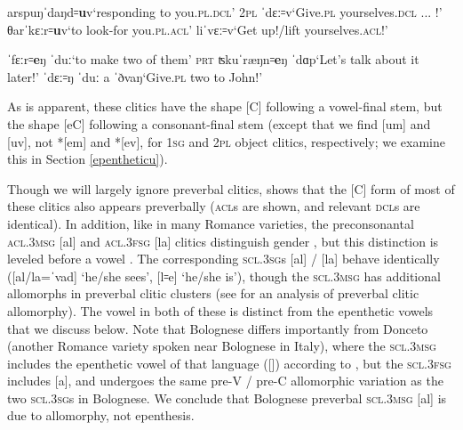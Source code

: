 \documentclass[output=paper,colorlinks,citecolor=brown]{langscibook}
\begin{document}
\begin{exe}
\begin{xlist}
                    \ex \begin{xlisti}
                        \ex arspuŋˈdaŋd꞊\textbf{u}v\tab `responding to you.\textsc{pl}.\textsc{dcl}'\tab \hspace{5mm} 2\textsc{pl}
                        \ex ˈdɛː꞊v\tab `Give.\textsc{pl} yourselves.\textsc{dcl} ... !'
                        \ex θarˈkɛːr꞊\textbf{u}v\tab `to look-for you.\textsc{pl}.\textsc{acl}'
                        \ex liˈvɛː꞊v\tab `Get up!/lift yourselves.\textsc{acl}!'
                    \end{xlisti}
                    \ex \begin{xlisti}
                        \ex ˈfɛːr꞊\textbf{e}ŋ ˈduː\tab `to make two of them'\tab \hspace{5mm} \textsc{prt}
                        \ex ʦkuˈræŋn꞊\textbf{e}ŋ ˈdɑp\tab `Let's talk about it later!'
                        \ex ˈdɛː꞊ŋ ˈduː a ˈðvaŋ\tab `Give.\textsc{pl} two to John!'
                    \end{xlisti}
                    
			\end{xlist}
\end{exe}


As is apparent, these clitics have the shape [C] following a vowel-final stem, but the shape [eC] following a consonant-final stem (except that we find [um] and [uv], not *[em] and *[ev], for 1\textsc{sg} and 2\textsc{pl} object clitics, respectively; we examine this in Section \ref{epentheticu}).


Though we will largely ignore preverbal clitics,  shows that the [C] form of most of these clitics also appears preverbally (\textsc{acl}s are shown, and relevant \textsc{dcl}s are identical). In addition, like in many Romance varieties, the preconsonantal \textsc{acl}.3\textsc{msg} [al] and \textsc{acl}.3\textsc{fsg} [la] clitics distinguish gender , but this distinction is leveled before a vowel . The corresponding \textsc{scl}.3\textsc{sg}s [al] / [la] behave identically ([al/la=ˈvad] `he/she sees', [l꞊e] `he/she is'), though the \textsc{scl}.3\textsc{msg} has additional allomorphs in preverbal clitic clusters (see \cite{rubinkaplanallomorphywithls} for an analysis of preverbal clitic allomorphy). The vowel in both of these is distinct from the epenthetic vowels that we discuss below. Note that Bolognese differs importantly from Donceto (another Romance variety spoken near Bolognese in Italy), where the \textsc{scl}.3\textsc{msg} includes the epenthetic vowel of that language ([\textschwa]) according to \citet{cardinalettirepetti:clitics}, but the \textsc{scl}.3\textsc{fsg} includes [a], and undergoes the same pre-V / pre-C allomorphic variation as the two \textsc{scl}.3\textsc{sg}s in Bolognese. We conclude that Bolognese preverbal \textsc{scl}.3\textsc{msg} [al] is due to allomorphy, not epenthesis.
\end{document}
